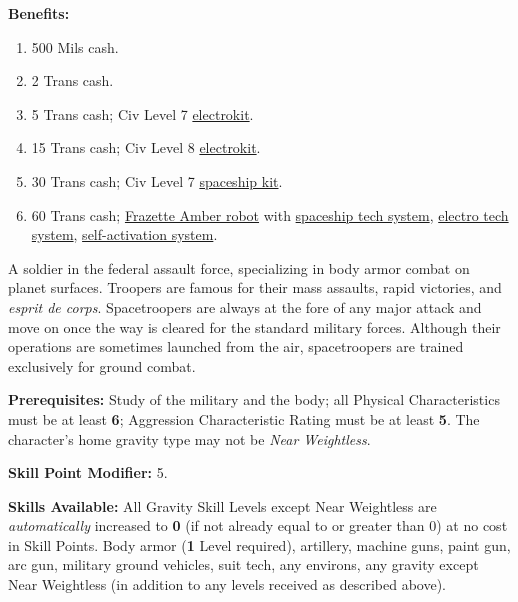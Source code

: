 \pagebreak[2]
\textbf{Benefits:}
\begin{enumerate}
\item 500 Mils cash.   
\item 2 Trans cash.  
\item 5 Trans cash; Civ Level 7 \hyperlink{tag:electrokit}{electrokit}.    
\item 15 Trans cash; Civ Level 8 \hyperlink{tag:electrokit}{electrokit}.   
\item 30 Trans cash; Civ Level 7 \hyperlink{tag:spaceshipkit}{spaceship kit}.    
\item 60 Trans cash; \hyperlink{tag:bot-frazette-amber}{Frazette Amber
  robot} with  \hyperlink{tag:bot-spaceshiptech}{spaceship tech system},
   \hyperlink{tag:bot-electrotech}{electro tech system}, \hyperlink{tag:bot-self-activation}{self-activation system}.
\end{enumerate}

\bigskip



\pagebreak[2]

 \label{sec:prof-spacetrooper}

A soldier in the federal assault force, specializing in body armor
combat on planet surfaces. Troopers are famous for their mass
assaults, rapid victories, and \emph{esprit de corps}. Spacetroopers
are always at the fore of any major attack and move on once the way is
cleared for the standard military forces. Although their operations
are sometimes launched from the air, spacetroopers are trained
exclusively for ground combat.

\textbf{Prerequisites:} Study of the military and the body; all
Physical Characteristics must be at least \textbf{6}; Aggression
Characteristic Rating must be at least \textbf{5}. The character's
home gravity type may not be \emph{Near Weightless}.

\textbf{Skill Point Modifier:} 5.

\textbf{Skills Available:} All Gravity Skill Levels except Near
Weightless are \emph{automatically} increased to \textbf{0} (if not
already equal to or greater than 0) at no cost in Skill Points. Body
armor (\textbf{1} Level required), artillery, machine guns, paint
gun, arc gun, military ground vehicles, suit tech, any environs, any
gravity except Near Weightless (in addition to any levels received as
described above).

